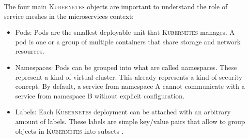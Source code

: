 The four main \textsc{Kubernetes} objects are important to understand the role of service meshes in the microservices context:
\begin{itemize}
\item Pods: Pods are the smallest deployable unit that \textsc{Kubernetes} manages. A pod is one or a group of multiple containers that share storage and network resources.
\item Namespaces: Pods can be grouped into what are called namespaces. These represent a kind of virtual cluster. This already represents a kind of security concept. By default, a service from namespace A cannot communicate with a service from namespace B without explicit configuration.
\item Labels: Each \textsc{Kubernetes} deployment can be attached with an arbitrary amount of labels. These labels are simple key/value pairs that allow to group objects in \textsc{Kubernetes} into subsets \cite{k8s}.
\end{itemize}